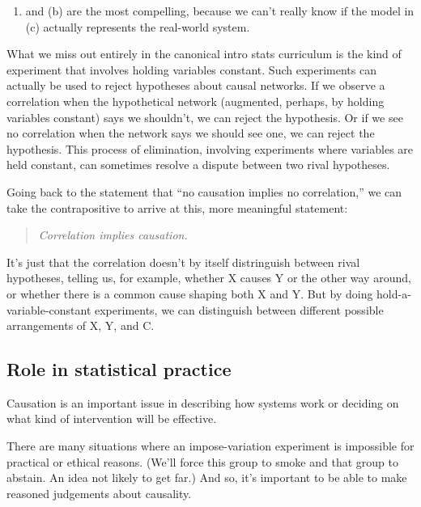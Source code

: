 \documentclass[nofonts,]{tufte-handout}
\providecommand{\tightlist}{%
  \setlength{\itemsep}{0pt}\setlength{\parskip}{0pt}}
\begin{document}
\begin{enumerate}
\def\labelenumi{(\alph{enumi})}
\tightlist
\item
  and (b) are the most compelling, because we can't really know if the
  model in (c) actually represents the real-world system.
\end{enumerate}

What we miss out entirely in the canonical intro stats curriculum is the
kind of experiment that involves holding variables constant. Such
experiments can actually be used to reject hypotheses about causal
networks. If we observe a correlation when the hypothetical network
(augmented, perhaps, by holding variables constant) says we shouldn't,
we can reject the hypothesis. Or if we see no correlation when the
network says we should see one, we can reject the hypothesis. This
process of elimination, involving experiments where variables are held
constant, can sometimes resolve a dispute between two rival hypotheses.

Going back to the statement that ``no causation implies no
correlation,'' we can take the contrapositive to arrive at this, more
meaningful statement:

\begin{quote}
\emph{Correlation implies causation.}
\end{quote}

It's just that the correlation doesn't by itself distringuish between
rival hypotheses, telling us, for example, whether X causes Y or the
other way around, or whether there is a common cause shaping both X and
Y. But by doing hold-a-variable-constant experiments, we can distinguish
between different possible arrangements of X, Y, and C.

\hypertarget{role-in-statistical-practice}{%
\subsection{Role in statistical
practice}\label{role-in-statistical-practice}}

Causation is an important issue in describing how systems work or
deciding on what kind of intervention will be effective.

There are many situations where an impose-variation experiment is
impossible for practical or ethical reasons. (We'll force this group to
smoke and that group to abstain. An idea not likely to get far.) And so,
it's important to be able to make reasoned judgements about causality.
\end{document}
